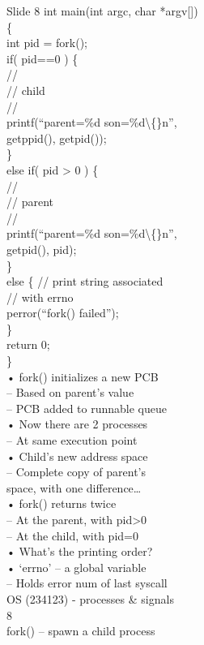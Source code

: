 \documentclass{beamer}
\begin{document}
\begin{frame}{Slide 8}
int main(int argc, char *argv[])\\\{\\  int pid = fork();\\  if( pid==0 ) \{ \\   //\\   // child\\      //\\      printf(“parent=\%d son=\%d\textbackslash\{\}n”,\\             getppid(), getpid());\\  \}\\  else if( pid > 0 ) \{\\      //\\      // parent\\      //\\      printf(“parent=\%d son=\%d\textbackslash\{\}n”,\\             getpid(), pid);\\  \}\\  else \{ // print string associated\\         // with errno   \\      perror(“fork() failed”); \\  \}\\  return 0;\\\}\\• fork() initializes a new PCB\\– Based on parent’s value\\– PCB added to runnable queue\\• Now there are 2 processes\\– At same execution point\\• Child’s new address space \\– Complete copy of parent’s \\space, with one difference…\\• fork() returns twice\\– At the parent, with pid>0\\– At the child, with pid=0\\• What’s the printing order?\\• ‘errno’ – a global variable\\– Holds error num of last syscall\\OS (234123) - processes \& signals\\8\\fork() – spawn a child process
\end{frame}
\end{document}
